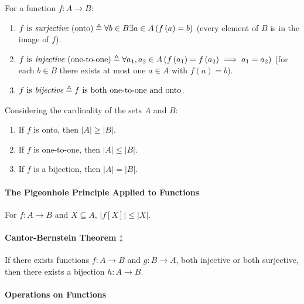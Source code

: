 \documentclass[10pt,twoside,twocolumn]{article}
\begin{document}
For a function $f:A\rightarrow B$:
\begin{enumerate}
\item $f\mbox{ is \emph{surjective} (onto)}\triangleq\forall b\in B\exists a\in A\left(f\left(a\right)=b\right)$
(every element of $B$ is in the image of $f$).
\item $f\mbox{ is \emph{injective} (one-to-one)}\triangleq\forall a_{1},a_{2}\in A\left(f\left(a_{1}\right)=f\left(a_{2}\right)\implies a_{1}=a_{2}\right)$
(for each $b\in B$ there exists at most one $a\in A$ with $f\left(a\right)=b$).
\item $f\mbox{ is \emph{bijective}}\triangleq f\mbox{ is both one-to-one and onto}$.
\end{enumerate}
Considering the cardinality of the sets $A$ and $B$:
\begin{enumerate}
\item If $f$ is onto, then $\left|A\right|\geq\left|B\right|$.
\item If $f$ is one-to-one, then $\left|A\right|\leq\left|B\right|$.
\item If $f$ is a bijection, then $\left|A\right|=\left|B\right|$.
\end{enumerate}

\paragraph{The Pigeonhole Principle Applied to Functions}

For $f:A\rightarrow B$ and $X\subseteq A$, $\left|f\left[X\right]\right|\leq\left|X\right|$.


\paragraph{Cantor-Bernstein Theorem $\boldsymbol{\ddagger}$}

If there exists functions $f:A\rightarrow B$ and $g:B\rightarrow A$,
both injective or both surjective, then there exists a bijection $h:A\rightarrow B$.


\paragraph{Operations on Functions}
\end{document}

